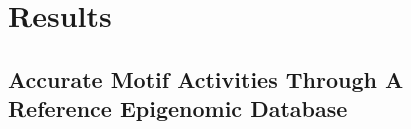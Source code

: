 


\section{Results}

\subsection{Accurate Motif Activities Through A Reference Epigenomic Database}

